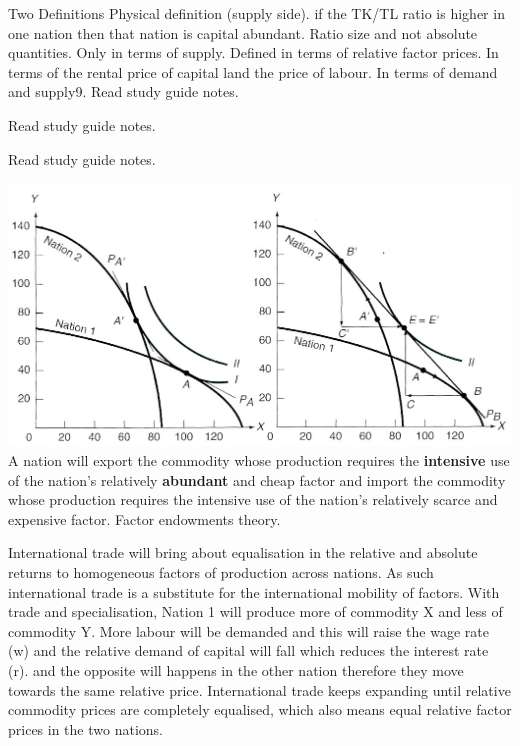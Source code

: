 \documentclass[12pt]{examnotes}
\begin{document}
\ra Two Definitions
 Physical definition (supply side). if the TK/TL ratio is higher in one nation then that nation is capital abundant. Ratio size and not absolute quantities. Only in terms of supply.
 Defined in terms of relative factor prices. In terms of the rental price of capital land the price of labour. In terms of demand and supply9.
\ra Read study guide notes.

\ra Read study guide notes.

\ra Read study guide notes.

\includegraphics[scale=0.4]{./imgs/54.jpg}
\ra A nation will export the commodity whose production requires the {\bf intensive} use of the nation's relatively {\bf abundant} and cheap factor and import the commodity whose production requires the intensive use of the nation's relatively scarce and expensive factor. 
\ra Factor endowments theory.

\ra International trade will bring about equalisation in the relative and absolute returns to homogeneous factors of production across nations. As such international trade is a substitute for the international mobility of factors. 
\ra With trade and specialisation, Nation 1 will produce more of commodity X and less of commodity Y. More labour will be demanded and this will raise the wage rate (w) and the relative demand of capital will fall which reduces the interest rate (r). and the opposite will happens in the other nation therefore they move towards the same relative price.
\ra International trade keeps expanding until relative commodity prices are completely equalised, which also means equal relative factor prices in the two nations.
\end{document}
